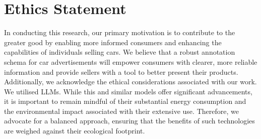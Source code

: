 \documentclass[11pt]{article}
\begin{document}




\section*{Ethics Statement}

In conducting this research, our primary motivation is to contribute to the greater good by enabling more informed consumers and enhancing the capabilities of individuals selling cars. We believe that a robust annotation schema for car advertisements will empower consumers with clearer, more reliable information and provide sellers with a tool to better present their products. Additionally, we acknowledge the ethical considerations associated with our work. We utilised LLMs. While this and similar models offer significant advancements, it is important to remain mindful of their substantial energy consumption and the environmental impact associated with their extensive use. Therefore, we advocate for a balanced approach, ensuring that the benefits of such technologies are weighed against their ecological footprint.


\end{document}
